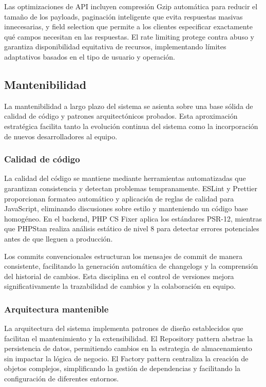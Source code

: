\documentclass[12pt,a4paper,oneside]{report}
\begin{document}
Las optimizaciones de API incluyen compresión Gzip automática para reducir el tamaño de los payloads, paginación inteligente que evita respuestas masivas innecesarias, y field selection que permite a los clientes especificar exactamente qué campos necesitan en las respuestas. El rate limiting protege contra abuso y garantiza disponibilidad equitativa de recursos, implementando límites adaptativos basados en el tipo de usuario y operación.

\subsection{Mantenibilidad}\label{mantenibilidad-1}

La mantenibilidad a largo plazo del sistema se asienta sobre una base sólida de calidad de código y patrones arquitectónicos probados. Esta aproximación estratégica facilita tanto la evolución continua del sistema como la incorporación de nuevos desarrolladores al equipo.

\subsubsection{Calidad de código}\label{calidad-de-cuxf3digo}

La calidad del código se mantiene mediante herramientas automatizadas que garantizan consistencia y detectan problemas tempranamente. ESLint y Prettier proporcionan formateo automático y aplicación de reglas de calidad para JavaScript, eliminando discusiones sobre estilo y manteniendo un código base homogéneo. En el backend, PHP CS Fixer aplica los estándares PSR-12, mientras que PHPStan realiza análisis estático de nivel 8 para detectar errores potenciales antes de que lleguen a producción.

Los commits convencionales estructuran los mensajes de commit de manera consistente, facilitando la generación automática de changelogs y la comprensión del historial de cambios. Esta disciplina en el control de versiones mejora significativamente la trazabilidad de cambios y la colaboración en equipo.

\subsubsection{Arquitectura mantenible}\label{arquitectura-mantenible}

La arquitectura del sistema implementa patrones de diseño establecidos que facilitan el mantenimiento y la extensibilidad. El Repository pattern abstrae la persistencia de datos, permitiendo cambios en la estrategia de almacenamiento sin impactar la lógica de negocio. El Factory pattern centraliza la creación de objetos complejos, simplificando la gestión de dependencias y facilitando la configuración de diferentes entornos.
\end{document}
